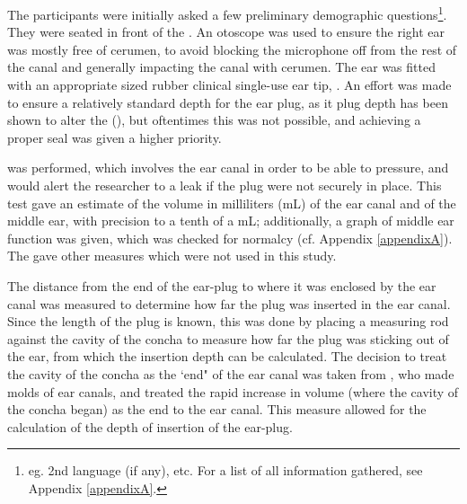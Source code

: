 The participants were initially asked a few preliminary demographic questions\footnote{eg. 2nd language (if any), etc. For a list of all information gathered, see Appendix \ref{appendixA}.}. They were seated in front of the \DIFdelbegin {}\DIFdelend \DIFaddbegin {}\DIFaddend .  An otoscope was used to ensure the right ear was mostly free of cerumen, to avoid blocking the microphone off from the rest of the canal and generally impacting the canal with cerumen.  The ear was fitted with an appropriate sized rubber clinical single-use ear tip, \DIFdelbegin {}\DIFdelend \DIFaddbegin {}\DIFaddend .  An effort was made to ensure a relatively standard depth for the ear plug, as it plug depth has been shown to alter the \DIFdelbegin {}\DIFdelend \DIFaddbegin {}\DIFaddend (\cite{dean:00,stenfelt:07}), but oftentimes this was not possible, and achieving a proper seal was given a higher priority.

\DIFdelbegin {}\DIFdelend \DIFaddbegin {}\DIFaddend was performed, which involves \DIFdelbegin {}\DIFdelend \DIFaddbegin {}\DIFaddend the ear canal in order to be able to \DIFdelbegin {}\DIFdelend \DIFaddbegin {}\DIFaddend pressure, and would alert the researcher to a leak if the plug were not securely in place.  This test gave an estimate of the volume in milliliters (mL) of the ear canal and of the middle ear, with precision to a tenth of a mL; additionally, a graph of middle ear function was given, which was checked for normalcy (cf. Appendix \ref{appendixA}).  The \DIFdelbegin {}\DIFdelend \DIFaddbegin {}\DIFaddend gave other measures which were not used in this study.

The distance from the end of the ear-plug to where it was enclosed by the ear canal was measured to determine how far the plug was inserted in the ear canal.
Since the length of the plug is known, this was done by placing a measuring rod against the cavity of the concha to measure how far the plug was sticking out of the ear, from which the insertion depth can be calculated. The decision to treat the cavity of the concha as the `end" of the ear canal was taken from \cite{stenfelt:07}, who made molds of ear canals, and treated the rapid increase in volume (where the cavity of the concha began) as the end to the ear canal.  This measure allowed for the calculation of the depth of insertion of the ear-plug.

